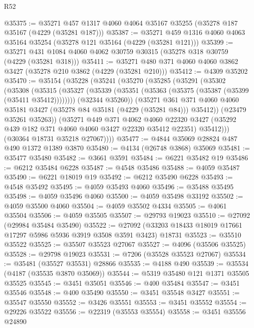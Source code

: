 \begin{lexlean}{R52}
\begin{coremodule}
@35375 := @35271 @457 @1317 @4060 @4064 @35167 @35255 (@35278 @187 @35167 (@4229 (@35281 @187)))
@35387 := @35271 @459 @1316 @4060 @4063 @35164 @35254 (@35278 @121 @35164 (@4229 (@35281 @121)))
@35399 := @35271 @431 @1084 @4060 @4062 @30759 @30315 (@35278 @318 @30759 (@4229 (@35281 @318)))
@35411 := @35271 @480 @371 @4060 @4060 @3862 @3427 (@35278 @210 @3862 (@4229 (@35281 @210)))
@35412 := @4309 @35202
@35470 := @35154
    (@35228
      (@35241
        (@35270
          (@35285
            (@35291
              (@35302
                (@35308
                  (@35315
                    (@35327 (@35339 (@35351 (@35363 (@35375 (@35387 (@35399 (@35411 @35412))))))))
                    (@32344 @35260))
                  (@35271
                    @361
                    @371
                    @4060
                    @4060
                    @35181
                    @3427
                    (@35278 @84 @35181 (@4229 (@35281 @84)))
                    @35412))
                (@23479 @35261 @35263))
              (@35271
                @449
                @371
                @4062
                @4060
                @22320
                @3427
                (@35292 @439 @182 @371 @4060 @4060 @3427 @22320 @35412 @22351)
                @35412)))
          (@30364 @18731 @35218 @27067))))
@35477 := @4844 @35069 @28824 @487 @490 @1372 @1389 @3870
@35480 := @4134 (@26748 @3868) @35069
@35481 := @35477 @35480
@35482 := @3661 @3591
@35484 := @6221 @35482 @19
@35486 := @6212 @35484 @6228
@35487 := @4548 @35486
@35488 := @4059 @35487
@35490 := @6221 @18019 @19
@35492 := @6212 @35490 @6228
@35493 := @4548 @35492
@35495 := @4059 @35493 @4060
@35496 := @35488 @35495
@35498 := @4059 @35496 @4060
@35500 := @4059 @35498 @33192
@35502 := @4059 @35500 @4060
@35504 := @4059 @35502 @4334
@35505 := @4061 @35504
@35506 := @4059 @35505
@35507 := @29793 @19023
@35510 := @27092 (@29984 @35484 @35490)
@35522 := @27092 (@33203 @18433 @18019 @17661 @17297 @5986 @5936 @3919 @3508 @3591 @3423) @18731
@35523 := @35510 @35522
@35525 := @35507 @35523 @27067
@35527 := @4096 (@35506 @35525)
@35528 := @29798 @19023
@35531 := @7206 (@35528 @35523 @27067)
@35534 := @35481 (@35527 @35531) @28866
@35535 := @4188 @490
@35539 := @35534 (@4187 (@35535 @3870 @35069))
@35544 := @5319 @35480 @121 @1371 @35505 @35525
@35545 := @3451 @35051
@35546 := @400 @35484
@35547 := @3451 @35546
@35548 := @400 @35490
@35550 := @3451 @35548 @3427
@35551 := @35547 @35550
@35552 := @3426 @35551
@35553 := @3451 @35552
@35554 := @29226 @35522
@35556 := @22319 (@35553 @35554)
@35558 := @3451 @35556 @24890

\end{coremodule}
\end{lexlean}
